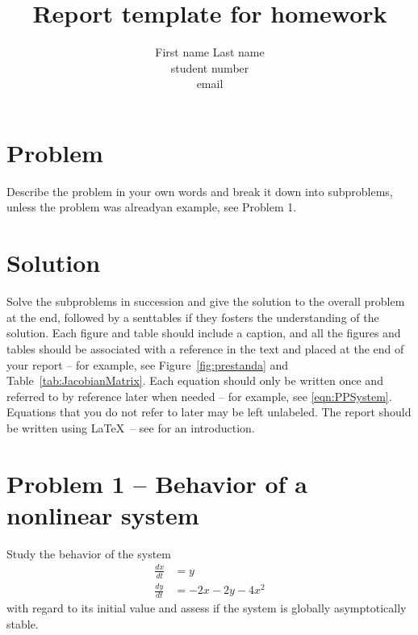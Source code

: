 \documentclass[a4paper]{article} %
\begin{document}

\title{Report template for homework}
\author{First name Last name \\ student number \\ email} 

\maketitle                     %





\section*{Problem}
\label{sec:prob}

Describe the problem in your own words and break it down into subproblems, unless the problem was alreadyan example, see Problem 1.

\section*{Solution}
\label{sec:sol}

Solve the subproblems in succession and give the solution to the overall problem at the end, followed by a senttables if they fosters the understanding of the solution. Each figure and table should include a caption, and all the figures and tables should be associated with a reference in the text and placed at the end of your report -- for example, see Figure~\ref{fig:prestanda} and Table~\ref{tab:JacobianMatrix}.  Each equation should only be written once and referred to by reference later when needed -- for example, see \eqref{eqn:PPSystem}. Equations that you do not refer to later may be left unlabeled. The report should be written using \LaTeX\ -- see \cite{Oetiker:2008:TheNotSoShortIntroductiontoLaTeXe} for an introduction.





\section*{Problem 1 -- Behavior of a nonlinear system}
\label{sec:prob1}
Study the behavior of the system
\begin{subequations}\label{eqn:PPSystem}
\begin{align}
    \frac{d x}{dt} & = y \label{eqn:PPSystem1} \\
    \frac{d y}{dt} & = -2x -2y -4 x^2 \label{eqn:PPSystem2}
\end{align}
\end{subequations}
with regard to its initial value and assess if the system is globally asymptotically stable.
\end{document}
